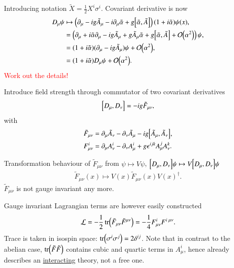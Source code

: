 Introducing notation $\tilde{X} = \frac{1}{2} X^i \sigma^i $. Covariant derivative is now  
\begin{align}
   D_\mu \psi &\mapsto \left( \partial_\mu - ig \tilde{A}_\mu - i \partial_\mu \tilde{\alpha} + g \comm{\tilde{\alpha}}{\tilde A} \right) (1 + i \tilde{\alpha}) \psi(x), \notag \\
              &= \left(\partial_\mu + i \tilde{\alpha}\partial_\mu - ig \tilde{A}_\mu + g \tilde{A}_\mu \tilde{\alpha} + g \comm{\tilde{\alpha}}{\tilde{A}} + \order{\alpha^2}\right) \psi, \notag \\
              &= (1 + i \tilde{\alpha}) (\partial_\mu - ig \tilde{A}_\mu) \psi + \order{\alpha^2}, \notag \\
              &= (1+ i\tilde{\alpha}) D_\mu \psi + \order{\alpha^2}.
\end{align}
\textcolor{red}{Work out the details!}

Introduce field strength through  commutator of two covariant derivatives
\begin{align}
   \comm{D_\mu}{D_\nu} = -ig \tilde{F}_{\mu\nu},
\end{align}
with
\begin{align}
   \tilde{F}_{\mu\nu} &= \partial_\mu \tilde{A}_\nu - \partial_\nu \tilde{A}_\mu - ig \comm{\tilde{A}_\mu}{\tilde{A}_\nu}, \\
   F_{\mu\nu}^i &= \partial_\mu A_\nu^i - \partial_\nu A_\mu^i + g \epsilon^{ijk} A^j_\mu A^k_\nu.
\end{align} 

Transformation behaviour of $\tilde{F}_{\mu\nu}$ from $\psi \mapsto V\psi$, $\comm{D_\mu}{D_\nu} \psi \mapsto V \comm{D_\mu}{D_\nu} \psi$
\begin{align*}
   \tilde{F}_{\mu\nu}(x) \mapsto V(x) \tilde{F}_{\mu\nu}(x) V(x)^\dagger.
\end{align*}
$\tilde{F}_{\mu\nu}$ is not gauge invariant any more.

Gauge invariant Lagrangian terms are however easily constructed
\begin{align}
   \mathcal{L} = -\frac{1}{2} \tr (\tilde{F}_{\mu\nu} \tilde{F}^{\mu\nu}) =  -\frac{1}{4} F^i_{\mu\nu} F^{i \; \mu\nu}.
\end{align}
Trace is taken in isospin space: $\tr(\sigma^i \sigma^j) = 2\delta^{ij}$. Note that in contrast to the abelian case, $\tr(\tilde{F}\tilde{F})$ contains cubic and quartic terms in $A_\mu^i$, hence already describes an \underline{interacting} theory, not a free one.

